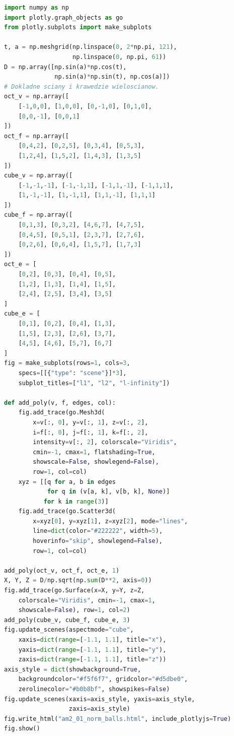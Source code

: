 \begin{lstlisting}[language=Python]
import numpy as np
import plotly.graph_objects as go
from plotly.subplots import make_subplots

t, a = np.meshgrid(np.linspace(0, 2*np.pi, 121),
                   np.linspace(0, np.pi, 61))
D = np.array([np.sin(a)*np.cos(t),
              np.sin(a)*np.sin(t), np.cos(a)])
# Dokladne sciany i krawedzie wieloscianow.
oct_v = np.array([
    [-1,0,0], [1,0,0], [0,-1,0], [0,1,0],
    [0,0,-1], [0,0,1]
])
oct_f = np.array([
    [0,4,2], [0,2,5], [0,3,4], [0,5,3],
    [1,2,4], [1,5,2], [1,4,3], [1,3,5]
])
cube_v = np.array([
    [-1,-1,-1], [-1,-1,1], [-1,1,-1], [-1,1,1],
    [1,-1,-1], [1,-1,1], [1,1,-1], [1,1,1]
])
cube_f = np.array([
    [0,1,3], [0,3,2], [4,6,7], [4,7,5],
    [0,4,5], [0,5,1], [2,3,7], [2,7,6],
    [0,2,6], [0,6,4], [1,5,7], [1,7,3]
])
oct_e = [
    [0,2], [0,3], [0,4], [0,5],
    [1,2], [1,3], [1,4], [1,5],
    [2,4], [2,5], [3,4], [3,5]
]
cube_e = [
    [0,1], [0,2], [0,4], [1,3],
    [1,5], [2,3], [2,6], [3,7],
    [4,5], [4,6], [5,7], [6,7]
]
fig = make_subplots(rows=1, cols=3,
    specs=[[{"type": "scene"}]*3],
    subplot_titles=["l1", "l2", "l-infinity"])

def add_poly(v, f, edges, col):
    fig.add_trace(go.Mesh3d(
        x=v[:, 0], y=v[:, 1], z=v[:, 2],
        i=f[:, 0], j=f[:, 1], k=f[:, 2],
        intensity=v[:, 2], colorscale="Viridis",
        cmin=-1, cmax=1, flatshading=True,
        showscale=False, showlegend=False),
        row=1, col=col)
    xyz = [[q for a, b in edges
            for q in (v[a, k], v[b, k], None)]
           for k in range(3)]
    fig.add_trace(go.Scatter3d(
        x=xyz[0], y=xyz[1], z=xyz[2], mode="lines",
        line=dict(color="#222222", width=5),
        hoverinfo="skip", showlegend=False),
        row=1, col=col)

add_poly(oct_v, oct_f, oct_e, 1)
X, Y, Z = D/np.sqrt(np.sum(D**2, axis=0))
fig.add_trace(go.Surface(x=X, y=Y, z=Z,
    colorscale="Viridis", cmin=-1, cmax=1,
    showscale=False), row=1, col=2)
add_poly(cube_v, cube_f, cube_e, 3)
fig.update_scenes(aspectmode="cube",
    xaxis=dict(range=[-1.1, 1.1], title="x"),
    yaxis=dict(range=[-1.1, 1.1], title="y"),
    zaxis=dict(range=[-1.1, 1.1], title="z"))
axis_style = dict(showbackground=True,
    backgroundcolor="#f5f6f7", gridcolor="#d5dbe0",
    zerolinecolor="#b0b8bf", showspikes=False)
fig.update_scenes(xaxis=axis_style, yaxis=axis_style,
                  zaxis=axis_style)
fig.write_html("am2_01_norm_balls.html", include_plotlyjs=True)
fig.show()
\end{lstlisting}

